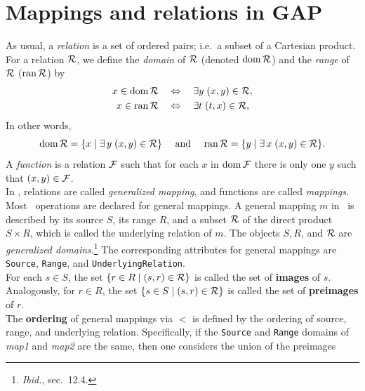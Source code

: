 \newpage

\section{Mappings and relations in GAP\protect\footnotemark}
\label{sec:mappings}
As usual, a {\it relation} is a set of ordered pairs; i.e.~a subset of a Cartesian product.
For a relation $\mathcal{R}$, we define the {\it domain} of $\mathcal{R}$ (denoted $\operatorname{dom} \mathcal{R}$) and
the {\it range} of $\mathcal{R}$ ($\mathrm{ran}\, \mathcal{R}$)
by
\begin{align*}
x \in  \operatorname{dom} \mathcal{R} \quad &\Leftrightarrow \quad \exists y \; (x,y) \in \mathcal{R},\\
x \in\mathrm{ran}\, \mathcal{R}  \quad &\Leftrightarrow \quad \exists t \; (t,x) \in \mathcal{R},\\
\end{align*}
In other words,
\[
\operatorname{dom} \mathcal{R} = \{x \mid \exists \, y \; (x,y)\in \mathcal{R}\}\quad \text{ and } \quad
\mathrm{ran}\, \mathcal{R} = \{y \mid \exists \, x \; (x,y)\in \mathcal{R}\}.
\]
A {\it function} is a relation $\mathcal{F}$ such that for each $x$ in $\operatorname{dom} \mathcal{F}$ there
is only one $y$ such that $(x, y) \in \mathcal{F}$.
\\[5pt]
In \gap, relations are called \emph{generalized mapping}, and functions are called \emph{mappings}.
Most \gap\ operations are declared for general mappings.
A general mapping $m$ in \gap\ is described by its source $S$, its range $R$, and
a subset $\mathcal{R}$ of the direct product $S \times R$, which is called the
underlying relation of $m$.  The objects $S, R$, and $\mathcal{R}$ are \emph{generalized
  domains}.\footnote{{\it Ibid.}, sec.~12.4.} 
The corresponding attributes for general mappings are {\tt Source}, {\tt Range}, and
{\tt UnderlyingRelation}.
\\[5pt]
For each $s \in S$, the set $\{r \in R \mid (s, r ) \in \mathcal{R}\}$ is called the set of
{\bf images} of $s$. 
Analogously, for $r \in R$, the set $\{s \in S \mid (s, r ) \in \mathcal{R}\}$ is called the
set of {\bf preimages} of $r$. 
\\[5pt]
The {\bf ordering} of general mappings via $<$ is defined by the ordering of source,
range, and underlying relation.  Specifically, if the {\tt Source} and {\tt Range} domains of
{\it map1} and {\it map2} are the same, then one considers the union of the preimages
